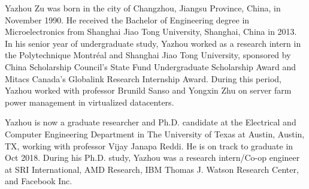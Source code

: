 
\begin{vita}

Yazhou Zu was born in the city of Changzhou, Jiangsu Province, China, in November 1990. He received the Bachelor of Engineering degree in Microelectronics from Shanghai Jiao Tong University, Shanghai, China in 2013. In his senior year of undergraduate study, Yazhou worked as a research intern in the Polytechnique Montréal and Shanghai Jiao Tong University, sponsored by China Scholarship Council's State Fund Undergraduate Scholarship Award and Mitacs Canada's Globalink Research Internship Award. During this period, Yazhou worked with professor Brunild Sanso and Yongxin Zhu on server farm power management in virtualized datacenters. 

Yazhou is now a graduate researcher and Ph.D. candidate at the Electrical and Computer Engineering Department in The University of Texas at Austin, Austin, TX, working with professor Vijay Janapa Reddi. He is on track to graduate in Oct 2018. During his Ph.D. study, Yazhou was a research intern/Co-op engineer at SRI International, AMD Research, IBM Thomas J. Watson Research Center, and Facebook Inc.

\end{vita}

